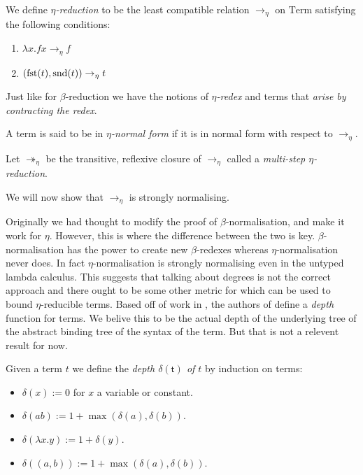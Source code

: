 \begin{defin}
    We define \emph{$\eta$-reduction} to be the least compatible relation $\to_{\eta}$ on $\mathrm{Term}$ satisfying the following conditions:
    \begin{enumerate}
        \item $\lambda x . f x \to_{\eta} f$
        \item $(\mathrm{fst}(t), \mathrm{snd}(t)) \to_{\eta} t$
    \end{enumerate}
    Just like for $\beta$-reduction we have the notions of \emph{$\eta$-redex} and terms that \emph{arise by contracting the redex}.
\end{defin}

\begin{defin}
    A term is said to be in \emph{$\eta$-normal form} if it is in normal form with respect to $\to_{\eta}$.
\end{defin}

\begin{defin}
    Let $\twoheadrightarrow_{\eta}$ be the transitive, reflexive closure of $\to_{\eta}$ called a \emph{multi-step $\eta$-reduction}.
\end{defin}

We will now show that $\to_\eta$ is strongly normalising.

\begin{remark}
    Originally we had thought to modify the proof of $\beta$-normal\-isa\-tion, and make it work for $\eta$. However, this is where the difference between the two is key.
    $\beta$-normal\-isa\-tion has the power to create new $\beta$-redexes whereas $\eta$-normalisation never does. In fact $\eta$-normalisation is strongly normalising even in the untyped lambda calculus. This suggests that talking about degrees is not the correct approach and there ought to be some other metric for which can be used to bound $\eta$-reducible terms. Based off of work in \cite{Fortune1983}, the authors of \cite[Ex. 3.21]{Sorensen} define a \emph{depth} function for terms. We belive this to be the actual depth of the underlying tree of the abstract binding tree of the syntax of the term. But that is not a relevent result for now.
\end{remark}

\begin{defin}
    Given a term $t$ we define the \emph{depth $\mathsf{\delta(t)}$ of $t$} by induction on terms:
    \begin{itemize}
        \item $\delta (x):=0$ for $x$ a variable or constant.
        \item $\delta (a b) := 1+ \max(\delta(a), \delta(b))$.
        \item $\delta (\lambda x . y):= 1 + \delta(y)$.
        \item $\delta ((a, b)) := 1 + \max(\delta(a), \delta(b))$.  
    \end{itemize}
\end{defin}

